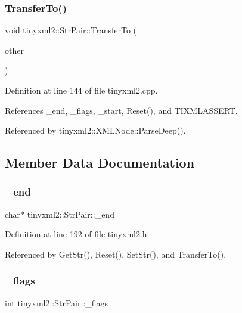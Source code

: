 \mbox{\label{classtinyxml2_1_1_str_pair_a35f795b1557fe5fdcbd93d3cc5d6b939}} 
\subsubsection{TransferTo()}
{\footnotesize\ttfamily void tinyxml2\+::\+Str\+Pair\+::\+Transfer\+To (\begin{DoxyParamCaption}\item[{\textbf{ Str\+Pair} $\ast$}]{other }\end{DoxyParamCaption})}



Definition at line 144 of file tinyxml2.\+cpp.



References \+\_\+end, \+\_\+flags, \+\_\+start, Reset(), and T\+I\+X\+M\+L\+A\+S\+S\+E\+RT.



Referenced by tinyxml2\+::\+X\+M\+L\+Node\+::\+Parse\+Deep().



\subsection{Member Data Documentation}
\mbox{\label{classtinyxml2_1_1_str_pair_a855c81f785458d8f84313221f2d4a1eb}} 
\subsubsection{\_end}
{\footnotesize\ttfamily char$\ast$ tinyxml2\+::\+Str\+Pair\+::\+\_\+end\hspace{0.3cm}{\ttfamily [private]}}



Definition at line 192 of file tinyxml2.\+h.



Referenced by Get\+Str(), Reset(), Set\+Str(), and Transfer\+To().

\mbox{\label{classtinyxml2_1_1_str_pair_ae6fabc08e7b24b0d41fa5f2fadbda4ed}} 
\subsubsection{\_flags}
{\footnotesize\ttfamily int tinyxml2\+::\+Str\+Pair\+::\+\_\+flags\hspace{0.3cm}{\ttfamily [private]}}



